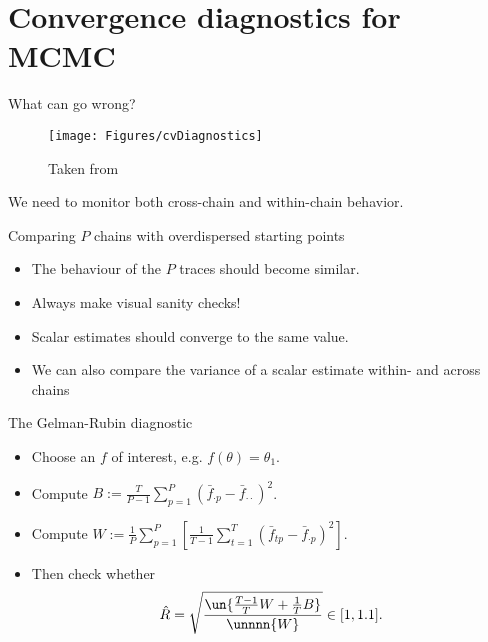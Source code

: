 \documentclass[10pt]{beamer}
\begin{document}


\section{Convergence diagnostics for MCMC}
\begin{frame}{What can go wrong?}
\begin{figure}
\texttt{[image: Figures/cvDiagnostics]}
\caption{Taken from \citep{GCSDVR13}}
\end{figure}
We need to monitor both cross-chain and within-chain behavior.
\end{frame}

\begin{frame}{Comparing $P$ chains with overdispersed starting points}
\begin{itemize}
  \item The behaviour of the $P$ traces should become similar.
  \item Always make visual sanity checks!
  \item Scalar estimates should converge to the same value.
  \item We can also compare the variance of a scalar estimate within- and across chains
\end{itemize}

  \begin{block}{The Gelman-Rubin diagnostic}
  \begin{itemize}
    \item Choose an $f$ of interest, e.g. $f(\theta) = \theta_1$.
    \item Compute $B:=\frac{T}{P-1}\sum_{p=1}^P (\bar f_{\cdot p} - \bar f_{\cdot\cdot})^2$.
    \item Compute $W:=\frac1P \sum_{p=1}^P\left[ \frac{1}{T-1} \sum_{t=1}^T (\bar f_{tp}-\bar f_{\cdot p})^2\right].$
    \item Then check whether
    $$\hat R = \sqrt{\frac{\un{\frac{T-1}{T}W + \frac1T B}}{\unnnn{W}}}\in[1,1.1].$$
  \end{itemize}
\end{block}
\end{frame}
\end{document}
